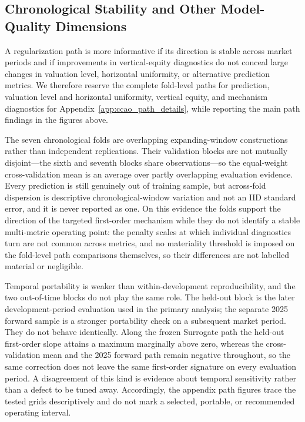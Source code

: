 \documentclass[10pt]{article}
\theoremstyle{definition}
\newcommand{\1}{\mathbf{1}}
\begin{document}
\subsection{Chronological Stability and Other Model-Quality Dimensions}
\label{subsec:path_stability_results}

A regularization path is more informative if its direction is stable across market
periods and if improvements in vertical-equity diagnostics do not conceal large
changes in valuation level, horizontal uniformity, or alternative prediction
metrics.
We therefore reserve the complete fold-level paths for prediction, valuation level and horizontal uniformity, vertical equity, and mechanism diagnostics for Appendix~\ref{app:ccao_path_details}, while reporting the main path findings in the figures above.

The seven chronological folds are overlapping expanding-window constructions rather
than independent replications. Their validation blocks are not mutually disjoint---the
sixth and seventh blocks share observations---so the equal-weight cross-validation mean
is an average over partly overlapping evaluation evidence. Every prediction is still
genuinely out of training sample, but across-fold dispersion is descriptive
chronological-window variation and not an IID standard error, and it is never reported
as one. On this evidence the folds support the direction of the targeted first-order
mechanism while they do not identify a stable multi-metric operating point: the
penalty scales at which individual diagnostics turn are not common across
metrics, and no materiality threshold is imposed on the fold-level path comparisons
themselves, so their differences are not labelled material or negligible.

Temporal portability is weaker than within-development reproducibility, and the two
out-of-time blocks do not play the same role. The held-out block is the later
development-period evaluation used in the primary analysis; the separate 2025 forward
sample is a stronger portability check on a subsequent market period. They do not
behave identically. Along the frozen Surrogate path the held-out first-order slope
attains a maximum marginally above zero, whereas the cross-validation mean and the 2025
forward path remain negative throughout, so the same correction does not leave the same
first-order signature on every evaluation period. A disagreement of this kind is
evidence about temporal sensitivity rather than a defect to be tuned away. Accordingly,
the appendix path figures trace the tested grids descriptively and do not mark a
selected, portable, or recommended operating interval.
\end{document}
